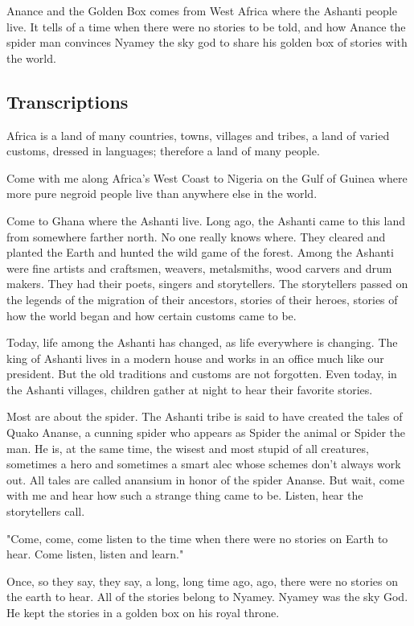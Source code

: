 Anance and the Golden Box comes from West Africa where the Ashanti people live. It tells of a time when there were no stories to be told, and how Anance the spider man convinces Nyamey the sky god to share his golden box of stories with the world.

\subsection{Transcriptions}

Africa is a land of many countries, towns, villages and tribes, a land of varied customs, dressed in languages; therefore a land of many people.

Come with me along Africa's West Coast to Nigeria on the Gulf of Guinea where more pure negroid people live than anywhere else in the world.

Come to Ghana where the Ashanti live. Long ago, the Ashanti came to this land from somewhere farther north. No one really knows where. They cleared and planted the Earth and hunted the wild game of the forest. Among the Ashanti were fine artists and craftsmen, weavers, metalsmiths, wood carvers and drum makers. They had their poets, singers and storytellers. The storytellers passed on the legends of the migration of their ancestors, stories of their heroes, stories of how the world began and how certain customs came to be.

Today, life among the Ashanti has changed, as life everywhere is changing. The king of Ashanti lives in a modern house and works in an office much like our president. But the old traditions and customs are not forgotten. Even today, in the Ashanti villages, children gather at night to hear their favorite stories.

Most are about the spider. The Ashanti tribe is said to have created the tales of Quako Ananse, a cunning spider who appears as Spider the animal or Spider the man. He is, at the same time, the wisest and most stupid of all creatures, sometimes a hero and sometimes a smart alec whose schemes don't always work out. All tales are called anansium in honor of the spider Ananse. But wait, come with me and hear how such a strange thing came to be. Listen, hear the storytellers call.

"Come, come, come listen to the time when there were no stories on Earth to hear. Come listen, listen and learn."

Once, so they say, they say, a long, long time ago, ago, there were no stories on the earth to hear. All of the stories belong to Nyamey. Nyamey was the sky God. He kept the stories in a golden box on his royal throne.

